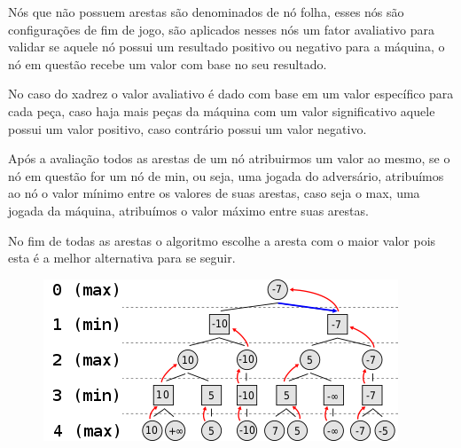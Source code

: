 Nós que não possuem arestas são denominados de nó folha, esses nós são configurações de fim de jogo, são aplicados nesses nós um fator avaliativo
para validar se aquele nó possui um resultado positivo ou negativo para a máquina, o nó em questão recebe um valor com base no seu resultado.


No caso do xadrez o valor avaliativo é dado com base em um valor específico para cada peça, caso haja mais peças da máquina com um valor
significativo aquele  possui um valor positivo, caso contrário possui um valor negativo.

Após a avaliação todos as arestas de um nó atribuirmos um valor ao mesmo, se o nó em questão for um nó de min, ou seja, uma jogada
do adversário, atribuímos ao nó o valor mínimo entre os valores de suas arestas, caso seja o max, uma jogada da máquina, atribuímos
o valor máximo entre suas arestas.

No fim de todas as arestas o algoritmo escolhe a aresta com o maior valor pois esta é a melhor alternativa para se seguir.

\begin{figure}[!ht]
    \centering
    \label{minimax}
    \includegraphics[scale=0.8]{figuras/minimax2.png}
\end{figure}

